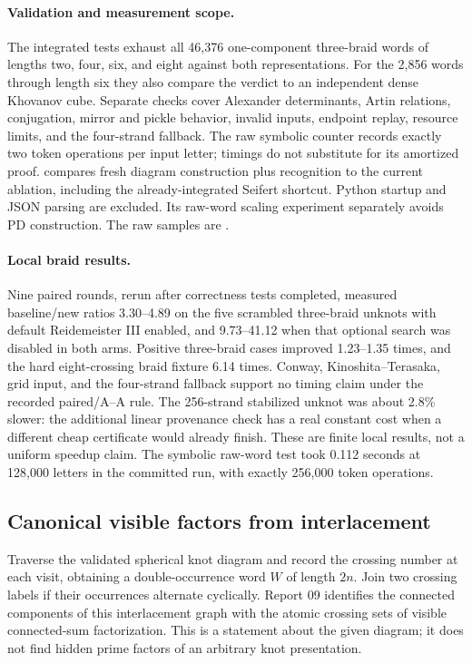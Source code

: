 \paragraph{Validation and measurement scope.}
The integrated tests exhaust all 46,376 one-component three-braid words
of lengths two, four, six, and eight against both representations.
For the 2,856 words through length six they also compare the verdict
to an independent dense Khovanov cube. Separate checks cover Alexander
determinants, Artin relations, conjugation, mirror and pickle behavior,
invalid inputs, endpoint replay, resource limits, and the four-strand
fallback. The raw symbolic counter records exactly two token operations
per input letter; timings do not substitute for its amortized proof.
 compares fresh diagram construction plus
recognition to the current  ablation, including
the already-integrated Seifert shortcut. Python startup and JSON parsing
are excluded. Its raw-word scaling experiment separately avoids PD
construction. The raw samples are
.

\paragraph{Local braid results.}
Nine paired rounds, rerun after correctness tests completed, measured
baseline/new ratios 3.30--4.89 on the five scrambled three-braid unknots
with default Reidemeister III enabled, and 9.73--41.12 when that optional
search was disabled in both arms. Positive three-braid cases improved
1.23--1.35 times, and the hard eight-crossing braid fixture 6.14 times.
Conway, Kinoshita--Terasaka, grid input, and the four-strand fallback
support no timing claim under the recorded paired/A--A rule. The
256-strand stabilized unknot was about 2.8\% slower: the additional
linear provenance check has a real constant cost when a different
cheap certificate would already finish. These are finite local results,
not a uniform speedup claim. The symbolic raw-word test took 0.112 seconds at 128,000
letters in the committed run, with exactly 256,000 token operations.


\subsection{Canonical visible factors from interlacement}
Traverse the validated spherical knot diagram and record the crossing
number at each visit, obtaining a double-occurrence word $W$ of length
$2n$. Join two crossing labels if their occurrences alternate cyclically.
Report 09 identifies the connected components of this interlacement
graph with the atomic crossing sets of visible connected-sum
factorization. This is a statement about the given diagram; it does not
find hidden prime factors of an arbitrary knot presentation.

